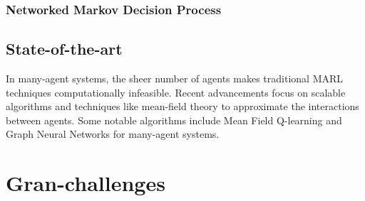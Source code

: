 \subsubsection{Networked Markov Decision Process}

\subsection{State-of-the-art}
In many-agent systems, the sheer number of agents makes traditional MARL techniques computationally infeasible. Recent advancements focus on scalable algorithms and techniques like mean-field theory to approximate the interactions between agents. Some notable algorithms include Mean Field Q-learning and Graph Neural Networks for many-agent systems.

\section{Gran-challenges}

\printbibliography